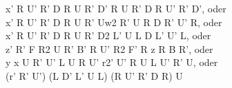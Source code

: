 x' R U' R' D R U R' D' R U R' D R U' R' D', oder\\
x' R U' R' D R U R' Uw2 R' U R D R' U' R, oder\\
x' R U' R' D R U R' D2 L' U L D L' U' L, oder\\
z' R' F R2 U R' B' R U' R2 F' R z R B R', oder\\
y x U R' U' L U R U' r2' U' R U L U' R' U, oder\\
(r' R' U') (L D' L' U L) (R U' R' D R) U\\
